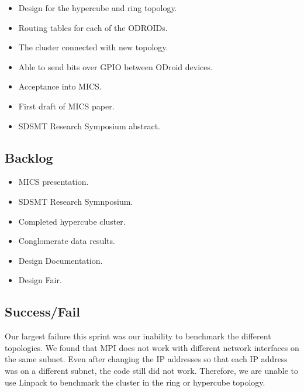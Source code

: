\begin{itemize}
\item Design for the hypercube and ring topology.
\item Routing tables for each of the ODROIDs.
\item The cluster connected with new topology.
\item Able to send bits over GPIO between ODroid devices.
\item Acceptance into MICS.
\item First draft of MICS paper.
\item SDSMT Research Symposium abstract.
\end{itemize}

\subsection{Backlog}

\begin{itemize}
\item MICS presentation.
\item SDSMT Research Symnposium.
\item Completed hypercube cluster.
\item Conglomerate data results.
\item Design Documentation.
\item Design Fair.
\end{itemize}

\subsection{Success/Fail}

Our largest failure this sprint was our inability to benchmark the different topologies. We found that MPI does not work with different network interfaces on the same subnet. Even after changing the IP addresses so that each IP address was on a different subnet, the code still did not work. Therefore, we are unable to use Linpack to benchmark the cluster in the ring or hypercube topology.
